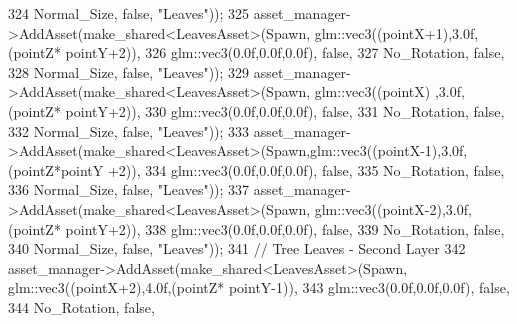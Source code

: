\begin{DoxyCode}
324                                                              Normal\_Size, \textcolor{keyword}{false}, \textcolor{stringliteral}{"Leaves"}));
325             asset\_manager->AddAsset(make\_shared<LeavesAsset>(Spawn, glm::vec3((pointX+1),3.0f,(pointZ*
      pointY+2)),
326                                                              glm::vec3(0.0f,0.0f,0.0f), \textcolor{keyword}{false},
327                                                              No\_Rotation, \textcolor{keyword}{false},
328                                                              Normal\_Size, \textcolor{keyword}{false}, \textcolor{stringliteral}{"Leaves"}));
329             asset\_manager->AddAsset(make\_shared<LeavesAsset>(Spawn, glm::vec3((pointX)  ,3.0f,(pointZ*
      pointY+2)),
330                                                              glm::vec3(0.0f,0.0f,0.0f), \textcolor{keyword}{false},
331                                                              No\_Rotation, \textcolor{keyword}{false},
332                                                              Normal\_Size, \textcolor{keyword}{false}, \textcolor{stringliteral}{"Leaves"}));
333             asset\_manager->AddAsset(make\_shared<LeavesAsset>(Spawn,glm::vec3((pointX-1),3.0f,(pointZ*pointY
      +2)),                                                       
334                                                              glm::vec3(0.0f,0.0f,0.0f), \textcolor{keyword}{false},
335                                                              No\_Rotation, \textcolor{keyword}{false},
336                                                              Normal\_Size, \textcolor{keyword}{false}, \textcolor{stringliteral}{"Leaves"}));
337             asset\_manager->AddAsset(make\_shared<LeavesAsset>(Spawn, glm::vec3((pointX-2),3.0f,(pointZ*
      pointY+2)),
338                                                              glm::vec3(0.0f,0.0f,0.0f), \textcolor{keyword}{false},
339                                                              No\_Rotation, \textcolor{keyword}{false},
340                                                              Normal\_Size, \textcolor{keyword}{false}, \textcolor{stringliteral}{"Leaves"}));
341             \textcolor{comment}{// Tree Leaves - Second Layer}
342             asset\_manager->AddAsset(make\_shared<LeavesAsset>(Spawn, glm::vec3((pointX+2),4.0f,(pointZ*
      pointY-1)),
343                                                              glm::vec3(0.0f,0.0f,0.0f), \textcolor{keyword}{false},
344                                                              No\_Rotation, \textcolor{keyword}{false},

\end{DoxyCode}
